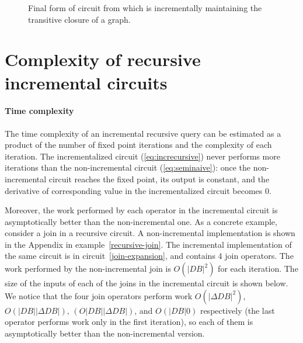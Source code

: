 \begin{figure*}[h]
\caption{Final form of circuit from \label{fig:recursive-example}
which is incrementally maintaining the transitive closure of a graph.}
\end{figure*}

\section{Complexity of recursive incremental circuits}

\paragraph{Time complexity}

The time complexity of an incremental recursive query can be estimated
as a product of the number of fixed point iterations and the
complexity of each iteration. The incrementalized circuit
(\ref{eq:increcursive}) never performs more iterations than the
non-incremental circuit (\ref{eq:seminaive}): once the non-incremental
circuit reaches the fixed point, its output is constant, and the
derivative of corresponding value in the incrementalized circuit
becomes 0.

Moreover, the work performed by each operator in the incremental
circuit is asymptotically better than the non-incremental one.  As a
concrete example, consider a join in a recursive circuit.  A
non-incremental implementation is shown in the Appendix in
example~\ref{recursive-join}.  The incremental implementation of the
same circuit is in circuit~\ref{join-expansion}, and contains 4 join
operators.  The work performed by the non-incremental join is
$O(|DB|^2)$ for each iteration.  The size of the inputs of each of the
joins in the incremental circuit is shown below.  We notice that the
four join operators perform work $O(|\Delta DB|^2)$, $O(|DB| |\Delta
DB|)$, $(O|DB| |\Delta DB|)$, and $O(|DB| 0)$ respectively (the last
operator performs work only in the first iteration), so each of them
is asymptotically better than the non-incremental version.

